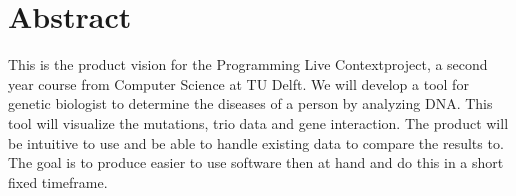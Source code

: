 \section*{Abstract}
This is the product vision for the Programming Live Contextproject, a second year course from Computer Science at TU Delft.
We will develop a tool for genetic biologist to determine the diseases of a person by analyzing DNA. This tool will visualize the mutations, trio data and gene interaction.
The product will be intuitive to use and be able to handle existing data to compare the results to.
The goal is to produce easier to use software then at hand and do this in a short fixed timeframe.